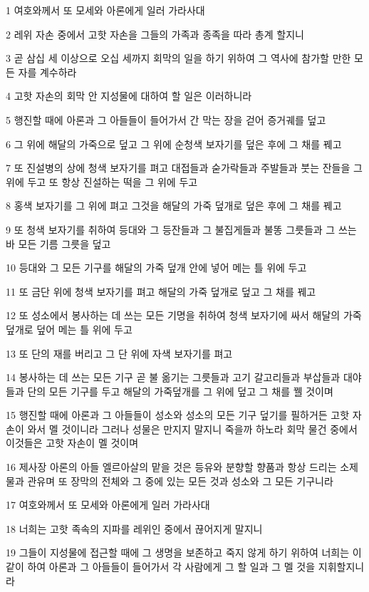\par 1 여호와께서 또 모세와 아론에게 일러 가라사대
\par 2 레위 자손 중에서 고핫 자손을 그들의 가족과 종족을 따라 총계 할지니
\par 3 곧 삼십 세 이상으로 오십 세까지 회막의 일을 하기 위하여 그 역사에 참가할 만한 모든 자를 계수하라
\par 4 고핫 자손의 회막 안 지성물에 대하여 할 일은 이러하니라
\par 5 행진할 때에 아론과 그 아들들이 들어가서 간 막는 장을 걷어 증거궤를 덮고
\par 6 그 위에 해달의 가죽으로 덮고 그 위에 순청색 보자기를 덮은 후에 그 채를 꿰고
\par 7 또 진설병의 상에 청색 보자기를 펴고 대접들과 숟가락들과 주발들과 붓는 잔들을 그 위에 두고 또 항상 진설하는 떡을 그 위에 두고
\par 8 홍색 보자기를 그 위에 펴고 그것을 해달의 가죽 덮개로 덮은 후에 그 채를 꿰고
\par 9 또 청색 보자기를 취하여 등대와 그 등잔들과 그 불집게들과 불똥 그릇들과 그 쓰는 바 모든 기름 그릇을 덮고
\par 10 등대와 그 모든 기구를 해달의 가죽 덮개 안에 넣어 메는 틀 위에 두고
\par 11 또 금단 위에 청색 보자기를 펴고 해달의 가죽 덮개로 덮고 그 채를 꿰고
\par 12 또 성소에서 봉사하는 데 쓰는 모든 기명을 취하여 청색 보자기에 싸서 해달의 가죽 덮개로 덮어 메는 틀 위에 두고
\par 13 또 단의 재를 버리고 그 단 위에 자색 보자기를 펴고
\par 14 봉사하는 데 쓰는 모든 기구 곧 불 옮기는 그릇들과 고기 갈고리들과 부삽들과 대야들과 단의 모든 기구를 두고 해달의 가죽덮개를 그 위에 덮고 그 채를 꿸 것이며
\par 15 행진할 때에 아론과 그 아들들이 성소와 성소의 모든 기구 덮기를 필하거든 고핫 자손이 와서 멜 것이니라 그러나 성물은 만지지 말지니 죽을까 하노라 회막 물건 중에서 이것들은 고핫 자손이 멜 것이며
\par 16 제사장 아론의 아들 엘르아살의 맡을 것은 등유와 분향할 향품과 항상 드리는 소제물과 관유며 또 장막의 전체와 그 중에 있는 모든 것과 성소와 그 모든 기구니라
\par 17 여호와께서 또 모세와 아론에게 일러 가라사대
\par 18 너희는 고핫 족속의 지파를 레위인 중에서 끊어지게 말지니
\par 19 그들이 지성물에 접근할 때에 그 생명을 보존하고 죽지 않게 하기 위하여 너희는 이같이 하여 아론과 그 아들들이 들어가서 각 사람에게 그 할 일과 그 멜 것을 지휘할지니라
